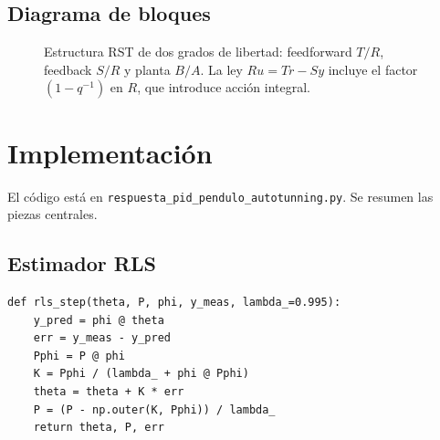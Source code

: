 \documentclass[a4paper,11pt]{report}
\begin{document}
\subsection{Diagrama de bloques}

\begin{figure}[H]
\centering
{}
\caption{Estructura RST de dos grados de libertad: feedforward $T/R$,
feedback $S/R$ y planta $B/A$. La ley $R u = T r - S y$ incluye el factor
$(1-q^{-1})$ en $R$, que introduce acción integral.}
\label{fig:blk}
\end{figure}

\section{Implementación}

El código está en \texttt{respuesta\_pid\_pendulo\_autotunning.py}. Se resumen
las piezas centrales.

\subsection{Estimador RLS}

\begin{lstlisting}[caption={Un paso de RLS con olvido.}]
def rls_step(theta, P, phi, y_meas, lambda_=0.995):
    y_pred = phi @ theta
    err = y_meas - y_pred
    Pphi = P @ phi
    K = Pphi / (lambda_ + phi @ Pphi)
    theta = theta + K * err
    P = (P - np.outer(K, Pphi)) / lambda_
    return theta, P, err
\end{lstlisting}
\end{document}

